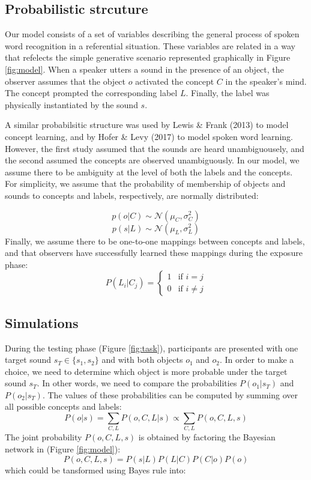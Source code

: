\documentclass[10pt, letterpaper]{article}
\begin{document}
\subsection{Probabilistic strcuture}\label{probabilistic-strcuture}

Our model consists of a set of variables describing the general process
of spoken word recognition in a referential situation. These variables
are related in a way that refelects the simple generative scenario
represented graphically in Figure \ref{fig:model}. When a speaker utters
a sound in the presence of an object, the observer assumes that the
object \(o\) activated the concept \(C\) in the speaker's mind. The
concept prompted the corresponding label \(L\). Finally, the label was
physically instantiated by the sound \(s\).

A similar probabilsitic structure was used by Lewis \& Frank (2013) to
model concept learning, and by Hofer \& Levy (2017) to model spoken word
learning. However, the first study assumed that the sounds are heard
unambiguousely, and the second assumed the concepts are observed
unambiguously. In our model, we assume there to be ambiguity at the
level of both the labels and the concepts. For simplicity, we assume
that the probability of membership of objects and sounds to concepts and
labels, respectively, are normally distributed:

\[ p(o | C) \sim  \mathcal{N}(\mu_C, \sigma^2_C) \]
\[ p(s| L) \sim  \mathcal{N}(\mu_L, \sigma^2_L) \] Finally, we assume
there to be one-to-one mappings between concepts and labels, and that
observers have successfully learned these mappings during the exposure
phase: \[
P(L_i|C_j) = 
\begin{cases}
  1 & \text{if  }  i=j \\  
  0  & \text{if  }  i\neq j 
\end{cases}
\]

\subsection{Simulations}\label{simulations}

During the testing phase (Figure \ref{fig:task}), participants are
presented with one target sound \(s_T \in\{s_1, s_2\}\) and with both
objects \(o_1\) and \(o_2\). In order to make a choice, we need to
determine which object is more probable under the target sound \(s_T\).
In other words, we need to compare the probabilities \(P(o_1|s_T)\) and
\(P(o_2|s_T)\). The values of these probabilities can be computed by
summing over all possible concepts and labels:
\[P(o|s)=\sum_{C,L} P(o, C, L| s) \propto \sum_{C,L} P(o, C, L, s) \]
The joint probability \(P(o, C, L, s)\) is obtained by factoring the
Bayesian network in (Figure \ref{fig:model}):
\[P(o,C,L,s) = P(s|L)P(L|C)P(C|o)P(o) \] which could be tansformed using
Bayes rule into:
\end{document}
